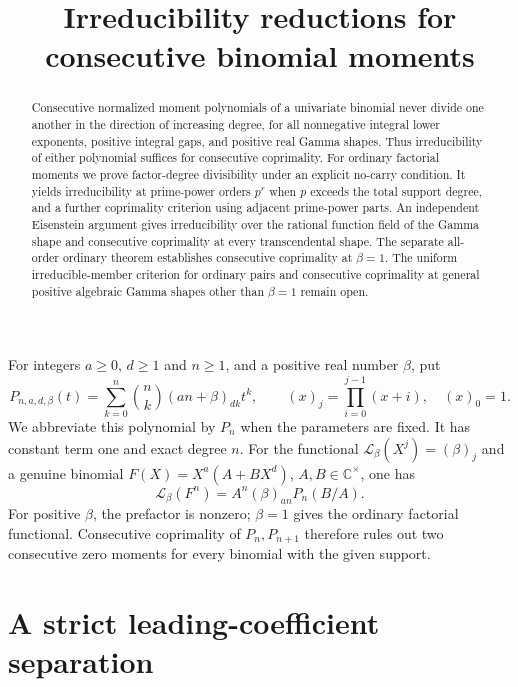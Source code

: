 \documentclass[11pt]{article}
\title{Irreducibility reductions for consecutive binomial moments}
\author{}
\date{}
\theoremstyle{remark}
\newcommand{\C}{\mathbb C}
\begin{document}
\maketitle
\begin{abstract}
Consecutive normalized moment polynomials of a univariate binomial never
divide one another in the direction of increasing degree, for all
nonnegative integral lower exponents, positive integral gaps, and positive
real Gamma shapes. Thus irreducibility of either polynomial suffices for
consecutive coprimality. For ordinary factorial moments we prove
factor-degree divisibility under an explicit no-carry condition. It yields
irreducibility at prime-power orders $p^r$ when $p$ exceeds the total support
degree, and a further coprimality criterion using adjacent prime-power parts. An independent Eisenstein argument gives
irreducibility over the rational function field of the Gamma shape and
consecutive coprimality at every transcendental shape. The separate
all-order ordinary theorem establishes consecutive coprimality at
$\beta=1$. The uniform irreducible-member criterion for ordinary
pairs and consecutive coprimality at general positive algebraic
Gamma shapes other than $\beta=1$ remain open.
\end{abstract}

For integers $a\ge0$, $d\ge1$ and $n\ge1$, and a positive real number
$\beta$, put
\begin{equation}\label{eq:definition}
 P_{n,a,d,\beta}(t)
 =\sum_{k=0}^n\binom nk(an+\beta)_{dk}t^k,
 \qquad
 (x)_j=\prod_{i=0}^{j-1}(x+i),\quad (x)_0=1 .
\end{equation}
We abbreviate this polynomial by $P_n$ when the parameters are fixed.
It has constant term one and exact degree $n$.
For the functional $\mathcal L_\beta(X^j)=(\beta)_j$ and a genuine
binomial $F(X)=X^a(A+BX^d)$, $A,B\in\C^\times$, one has
\begin{equation}\label{eq:moment-normalization}
 \mathcal L_\beta(F^n)=A^n(\beta)_{an}P_n(B/A).
\end{equation}
For positive $\beta$, the prefactor is nonzero; $\beta=1$ gives the
ordinary factorial functional. Consecutive coprimality of $P_n,P_{n+1}$
therefore rules out two consecutive zero moments for every binomial
with the given support.

\section{A strict leading-coefficient separation}
\end{document}

